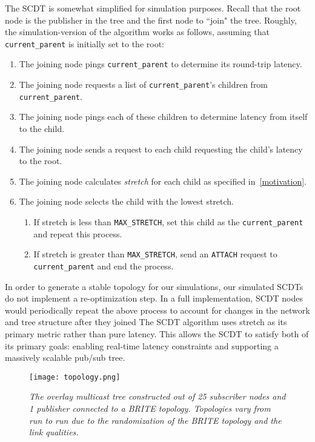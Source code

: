 The SCDT is somewhat simplified for simulation purposes. Recall that the root node is the publisher in the tree and the first node to ``join" the tree. Roughly, the simulation-version of the algorithm works as follows, assuming that \texttt{current\_parent} is initially set to the root:

\begin{enumerate}
	\item The joining node pings \texttt{current\_parent} to determine its round-trip latency.
	\item The joining node requests a list of \texttt{current\_parent}'s children from \texttt{current\_parent}.
	\item The joining node pings each of these children to determine latency from itself to the child.
	\item The joining node sends a request to each child requesting the child's latency to the root.
	\item The joining node calculates \textit{stretch} for each child as specified in~\autoref{motivation}.
	\item The joining node selects the child with the lowest stretch. 
	\begin{enumerate}
		\item If stretch is less than \texttt{MAX\_STRETCH}, set this child as the \texttt{current\_parent} and repeat this process. 
		\item If stretch is greater than \texttt{MAX\_STRETCH}, send an \texttt{ATTACH} request to \texttt{current\_parent} and end the process.
	\end{enumerate}
\end{enumerate}

In order to generate a stable topology for our simulations, our simulated SCDTs do not implement a re-optimization step. In a full implementation, SCDT nodes would periodically repeat the above process to account for changes in the network and tree structure after they joined The SCDT algorithm uses stretch as its primary metric rather than pure latency. This allows the SCDT to satisfy both of its primary goals: enabling real-time latency constraints and supporting a massively scalable pub/sub tree.

\begin{figure}[h]
	\begin{center}
		\texttt{[image: topology.png]}
	\end{center}
	\vspace{-1.3em}
	\caption{\small \itshape The overlay multicast tree constructed out of 25 subscriber nodes and 1 publisher connected to a BRITE topology. Topologies vary from run to run due to the randomization of the BRITE topology and the link qualities.}
	\vspace{-1em}
	\label{fig:topology}
\end{figure}

